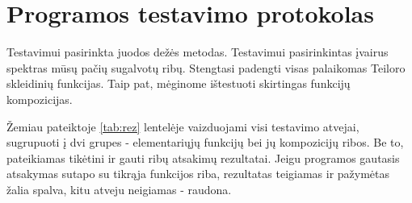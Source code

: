\section{Programos testavimo protokolas}

    Testavimui pasirinkta juodos dežės metodas. 
    Testavimui pasirinkintas įvairus spektras mūsų pačių sugalvotų ribų. 
	Stengtasi padengti visas palaikomas Teiloro skleidinių funkcijas.
	Taip pat, mėginome ištestuoti skirtingas funkcijų kompozicijas.
	
	Žemiau pateiktoje \ref{tab:rez} lentelėje vaizduojami visi testavimo atvejai, sugrupuoti į dvi grupes - 
	elementariųjų funkcijų bei jų kompozicijų ribos. 
	Be to, pateikiamas tikėtini ir gauti ribų atsakimų rezultatai. 
	Jeigu programos gautasis atsakymas sutapo su tikrąja funkcijos riba, 
    rezultatas teigiamas ir pažymėtas žalia spalva, kitu atveju neigiamas - raudona.
    
